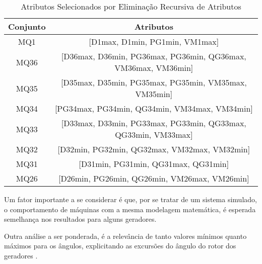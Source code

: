 \documentclass[12pt,oneside,a4paper,chapter=TITLE,section=TITLE,sumario=tradicional,english,brazil]{abntex2}
\begin{document}
\begin{table}[h]
\centering
\caption{Atributos Selecionados por Eliminação Recursiva de Atributos}
\begin{tabular}{c|c}
\toprule
   Conjunto &                                                             Atributos \\
\midrule
 MQ1 &                                [D1max, D1min, PG1min, VM1max] \\
MQ36 & [D36max, D36min, PG36max, PG36min, QG36max, VM36max, VM36min] \\
MQ35 &          [D35max, D35min, PG35max, PG35min, VM35max, VM35min] \\
MQ34 &                 [PG34max, PG34min, QG34min, VM34max, VM34min] \\
MQ33 & [D33max, D33min, PG33max, PG33min, QG33max, QG33min, VM33max] \\
MQ32 &                  [D32min, PG32min, QG32max, VM32max, VM32min] \\
MQ31 &                           [D31min, PG31min, QG31max, QG31min] \\
MQ26 &                  [D26min, PG26min, QG26min, VM26max, VM26min] \\
\bottomrule
\end{tabular}
\end{table}
\par 
Um fator importante a se considerar é que, por se tratar de um sistema simulado, o comportamento de máquinas com a mesma modelagem matemática, é esperada semelhança nos resultados para alguns geradores.\par 
\newpage 
Outra análise a ser ponderada, é a relevância de tanto valores mínimos quanto máximos para os ângulos, explicitando as excursões do ângulo do rotor dos geradores \cite{kundur1994}. \par 
\end{document}
